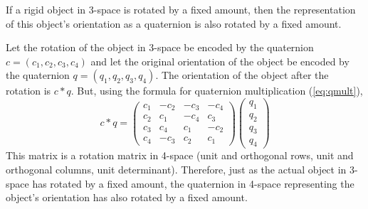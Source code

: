 \documentclass[12pt]{article}
\begin{document}
\begin{lemma}
\label{lem:constant}
If a rigid object in 3-space is rotated by a fixed amount,
then the representation of this object's orientation as a quaternion is also 
rotated by a fixed amount.
\end{lemma}
\prf
Let the rotation of the object in 3-space be encoded 
by the quaternion $c = (c_1,c_2,c_3,c_4)$
and let the original orientation of the object 
be encoded by the quaternion $q = (q_1,q_2,q_3,q_4)$.
The orientation of the object after the rotation is $c*q$.
But, using the formula for quaternion multiplication (\ref{eq:qmult}),
\[
c * q = \left( \begin{array}{cccc}
	c_1 & -c_2 & -c_3 & -c_4 \\
	c_2 &  c_1 & -c_4 &  c_3 \\
	c_3 &  c_4 &  c_1 & -c_2 \\
	c_4 & -c_3 &  c_2 &  c_1
	\end{array} \right)
	\left( \begin{array}{c}
	q_1 \\ q_2 \\ q_3 \\ q_4
	\end{array} \right)
\]
This matrix is a rotation matrix in 4-space (unit and orthogonal rows, unit and orthogonal
columns, unit determinant).
Therefore, just as the actual object in 3-space has rotated by a fixed amount,
the quaternion in 4-space representing the object's orientation
has also rotated by a fixed amount.
\QED
\end{document}
